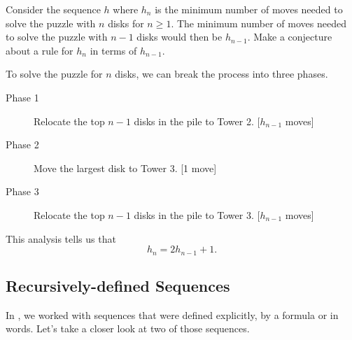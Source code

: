 \begin{exam}
\label{exam_hanoi_recursion}
    Consider the sequence $h$ where $h_n$ is the minimum number of moves needed to solve the puzzle with $n$ disks for $n \ge 1$.  The minimum number of moves needed to solve the puzzle with $n-1$ disks would then be $h_{n-1}$.  Make a conjecture about a rule for $h_n$ in terms of $h_{n-1}$.
        \begin{soln}
            To solve the puzzle for $n$ disks, we can break the process into three phases.  
                \begin{description}
                    \item [\quad Phase 1] Relocate the top $n-1$ disks in the pile to Tower 2.  [$h_{n-1}$ moves]
                    \item [\quad Phase 2] Move the largest disk to Tower 3.  [1 move]
                    \item [\quad Phase 3] Relocate the top $n-1$ disks in the pile to Tower 3.  [$h_{n-1}$ moves]
                \end{description}
            This analysis tells us that $$h_n=2h_{n-1}+1.$$
        \end{soln}
\end{exam}


\newcommand{\subrecdefseq}{Recursively-defined Sequences}
\subsection{\subrecdefseq}
\label{sub_seq_recursive}

In , we worked with sequences that were defined explicitly, by a formula or in words. Let's take a closer look at two of those sequences.

